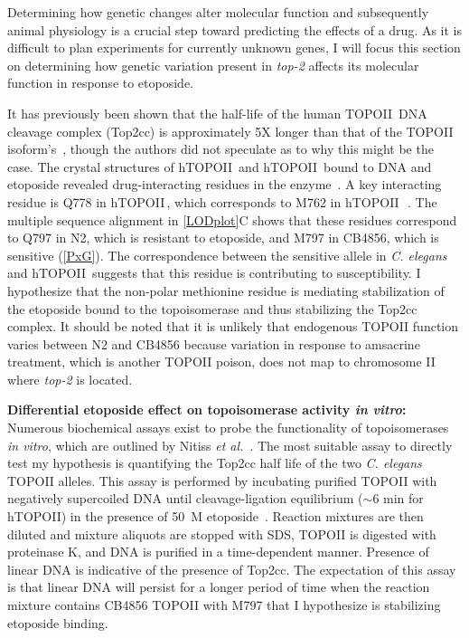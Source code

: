\documentclass[12pt]{article}
\begin{document}
Determining how genetic changes alter molecular function and subsequently animal physiology is a crucial step toward predicting the effects of a drug. As it is difficult to plan experiments for currently unknown genes, I will focus this section on determining how genetic variation present in {\it top-2} affects its molecular function in response to etoposide.
\vspace{5pt}

It has previously been shown that the half-life of the human TOPOII\textalpha\, DNA cleavage complex (Top2cc) is approximately 5X longer than that of the TOPOII\textbeta\, isoform's~\cite{Bandele:2008df}, though the authors did not speculate as to why this might be the case. The crystal structures of hTOPOII\textalpha\, and hTOPOII\textbeta\, bound to DNA and etoposide revealed drug-interacting residues in the enzyme~\cite{Wu:2011ih,Wendorff:2012dg}. A key interacting residue is Q778 in hTOPOII\textbeta\,, which corresponds to M762 in hTOPOII\textalpha\,~\cite{Wu:2013dia}. The multiple sequence alignment in \autoref{LODplot}C shows that these residues correspond to Q797 in N2, which is resistant to etoposide, and M797 in CB4856, which is sensitive (\autoref{PxG}). The correspondence between the sensitive allele in {\it C. elegans} and hTOPOII\textalpha\, suggests that this residue is contributing to susceptibility. I hypothesize that the non-polar methionine residue is mediating stabilization of the etoposide bound to the topoisomerase and thus stabilizing the Top2cc complex. It should be noted that it is unlikely that endogenous TOPOII function varies between N2 and CB4856 because variation in response to amsacrine treatment, which is another TOPOII poison, does not map to chromosome II where {\it top-2} is located. 

\vspace{5pt}

{\bf Differential etoposide effect on topoisomerase activity {\itshape in vitro}: }Numerous biochemical assays exist to probe the functionality of topoisomerases {\it in vitro}, which are outlined by Nitiss {\it et al.}~\cite{Nitiss:2001fv}. The most suitable assay to directly test my hypothesis is quantifying the Top2cc half life of the two {\it C. elegans} TOPOII alleles. This assay is performed by incubating purified TOPOII with negatively supercoiled DNA until cleavage-ligation equilibrium ($\sim$6 min for hTOPOII) in the presence of 50~\textmu M etoposide~\cite{Bandele:2007ko,Bandele:2008df}. Reaction mixtures are then diluted and mixture aliquots are stopped with SDS, TOPOII is digested with proteinase K, and DNA is purified in a time-dependent manner. Presence of linear DNA is indicative of the presence of Top2cc. The expectation of this assay is that linear DNA will persist for a longer period of time when the reaction mixture contains CB4856 TOPOII with M797 that I hypothesize is stabilizing etoposide binding.
\end{document}
